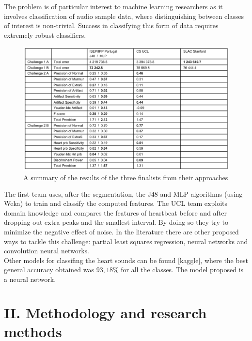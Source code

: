 \documentclass[11pt]{report}
\theoremstyle{plain}
\theoremstyle{definition}
\theoremstyle{definition}
\theoremstyle{proposition}
\begin{document}
The problem is of particular interest to machine learning researchers as it involves classification of audio sample data, where distinguishing between classes of interest is non-trivial. Success in classifying this form of data requires extremely robust classifiers. 
\\

\begin{figure}[h]
\includegraphics[width=14.5cm]{challengeresults.png}
\centering
\caption{A summary of the results of the three finalists from their approaches}
\end{figure}

The first team uses, after the segmentation, the J48 and MLP algorithms (using Weka) to train and
classify the computed features. The UCL team exploits domain knowledge and
compares the features of heartbeat before and after dropping out extra peaks and
the smallest interval. By doing so they try to minimize the negative effect of noise.
In the literature there are other proposed ways to tackle this challenge: partial
least squares regression, neural networks and convolution neural networks.
\\

Other models for classifing the heart sounds can be found [kaggle], where the best general accuracy obtained was $93,18 \%$ for all the classes. The model proposed is a neural network.


\newpage



\chapter*{II. Methodology and research methods}
\end{document}
